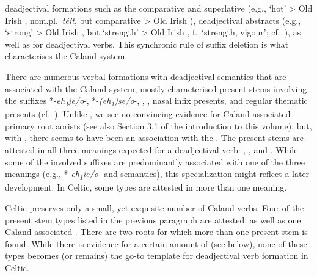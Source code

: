 \documentclass[output=paper,colorlinks,citecolor=brown]{langscibook}
\begin{document}
deadjectival formations such as the comparative and superlative (e.g.,  ‘hot’ > Old Irish , nom.pl.\ \textit{téit}, but comparative  > Old Irish ), deadjectival abstracts  (e.g.,  ‘strong’ > Old Irish , but  ‘strength’ > Old Irish , f.\ ‘strength, vigour’; cf.\ \citealt{Jasanoff1991}), as well as for deadjectival verbs. This synchronic rule of suffix deletion is what characterises the Caland system. 

There are numerous verbal formations with deadjectival  semantics that are associated with the Caland system,  mostly characterised present stems involving the suffixes  *-\textit{eh\textsubscript{1}i̯e/o}-,   *-\textit{(eh\textsubscript{1})s\kinvbreve e/o}-, , , nasal infix presents,  and regular thematic presents  (cf.\ \citealt[136--160]{Rau2009}). Unlike \citet{Bozzone2016}, we see no convincing evidence for Caland-associated   primary  root aorists (see also Section 3.1 of the introduction to this volume), but, with \citet{Rau2013}, there seems to have been an association with the . The present stems are attested in all three meanings expected for a deadjectival verb: , , and . While some of the involved suffixes are predominantly associated with one of the three meanings (e.g., *-\textit{eh\textsubscript{1}i̯e/o}-   and  semantics), this specialization might reflect a later development. In Celtic, some types are attested in more than one meaning.

Celtic preserves only a small, yet exquisite number of Caland verbs.  Four of the present stem types listed in the previous paragraph are attested, as well as one Caland-associated . There are two roots for which more than one present stem is found. While there is evidence for a certain amount of  (see below), none of these types becomes (or remains) the go-to template for deadjectival verb formation in Celtic. 
\end{document}
